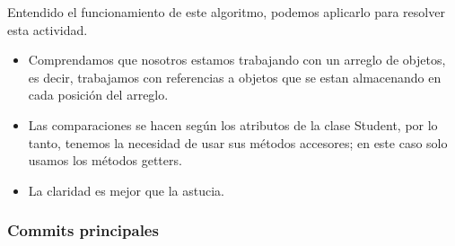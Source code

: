 Entendido el funcionamiento de este algoritmo, podemos aplicarlo para resolver esta actividad. 
  \begin{itemize}
    \item Comprendamos que nosotros estamos trabajando con un arreglo de objetos, es decir, trabajamos con referencias a objetos que se estan almacenando en cada posición del arreglo.
    \item Las comparaciones se hacen según los atributos de la clase Student, por lo tanto, tenemos la necesidad de usar sus métodos accesores; en este caso solo usamos los métodos getters.
    \item La claridad es mejor que la astucia.
  \end{itemize}

\subsubsection{Commits principales}


